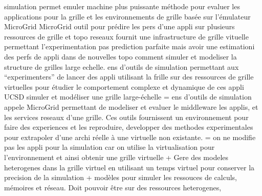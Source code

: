 simulation permet emuler machine plus puissante
méthode pour evaluer les applications pour la grille et les environnements de grille basée sur l'émulateur MicroGrid
MicroGrid outil pour prédire les pers d'une appli sur plusieurs ressources de grille et topo reseaux fournit une infrastructure de grille vituelle permettant l'experimentation
pas prediction parfaite mais avoir une estimationi des perfs de appli dans de nouvelles topo
comment simuler et modeliser la structure de grilles large echelle. ens d'outils de simulation permettant aux ``experimenters'' de lancer des appli utilisant la frille sur des ressources de grille virtuelles pour étudier le comportement complexe et dynamique de ces appli
UCSD simuler  et modéliser une grille large-échelle
= ens d'outils de simulation appele MicroGrid permettant de modeliser et evaluer le middleware les applis, et les services reseaux d'une grille. Ces outils fournissent un environnement pour faire des experiences et les reproduire, developper des methodes experimentales pour extrapoler d'une archi réelle à une virtuelle non existante.
= on ne modifie pas les appli pour la simulation car on utilise la virtualisation pour l'environnement et ainsi obtenir une grille virtuelle + Gere des modeles heterogenes dans la grille virtuel en utilisant un temps virtuel pour conserver la precision de la simulation + modèles pour simuler les ressouces de calculs, mémoires et réseau. Doit pouvoir être sur des ressources heterogenes, 

